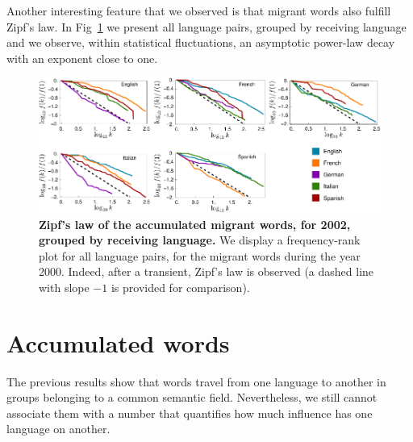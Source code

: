\documentclass[10pt,letterpaper]{article} %
\begin{document}
Another interesting feature that we observed is that migrant words also 
fulfill Zipf's law. In Fig~\ref{fig.ZL_receiving} we present all language pairs, 
grouped by receiving language and we observe, 
within statistical fluctuations, an asymptotic power-law decay with an exponent
close to one. %


\begin{figure}[!h]
	\begin{adjustwidth}{-2cm}{1cm}
		\centering
		\includegraphics{images/zipfFinal.pdf}
		\caption{{\bf Zipf's law of the accumulated migrant words, for 2002,
grouped by receiving language.} We display a frequency-rank 
plot for all language pairs, for the migrant words during the year 2000.
Indeed, after a transient, Zipf's law is observed (a dashed line with slope $-1$ is
provided for comparison). }
		\label{fig.ZL_receiving}
	\end{adjustwidth}
\end{figure}

\section*{Accumulated words} %

The previous results show that words travel from one language to another in
groups belonging to a common semantic field. Nevertheless, we still cannot
associate them with a number that quantifies how much influence has one
language on another.
\end{document}
